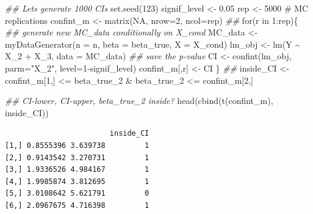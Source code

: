 \documentclass[
  letterpaper,
  DIV=11,
  numbers=noendperiod]{scrreprt}
\newenvironment{Shaded}{\begin{snugshade}}{\end{snugshade}}
\newcommand{\AttributeTok}[1]{\textcolor[rgb]{0.40,0.45,0.13}{#1}}
\newcommand{\CommentTok}[1]{\textcolor[rgb]{0.37,0.37,0.37}{#1}}
\newcommand{\ConstantTok}[1]{\textcolor[rgb]{0.56,0.35,0.01}{#1}}
\newcommand{\ControlFlowTok}[1]{\textcolor[rgb]{0.00,0.23,0.31}{#1}}
\newcommand{\DecValTok}[1]{\textcolor[rgb]{0.68,0.00,0.00}{#1}}
\newcommand{\DocumentationTok}[1]{\textcolor[rgb]{0.37,0.37,0.37}{\textit{#1}}}
\newcommand{\FloatTok}[1]{\textcolor[rgb]{0.68,0.00,0.00}{#1}}
\newcommand{\FunctionTok}[1]{\textcolor[rgb]{0.28,0.35,0.67}{#1}}
\newcommand{\NormalTok}[1]{\textcolor[rgb]{0.00,0.23,0.31}{#1}}
\newcommand{\OtherTok}[1]{\textcolor[rgb]{0.00,0.23,0.31}{#1}}
\newcommand{\SpecialCharTok}[1]{\textcolor[rgb]{0.37,0.37,0.37}{#1}}
\newcommand{\StringTok}[1]{\textcolor[rgb]{0.13,0.47,0.30}{#1}}
\theoremstyle{definition}
\theoremstyle{plain}
\theoremstyle{plain}
\theoremstyle{remark}
\begin{document}
\begin{Shaded}
\begin{Highlighting}[]
\DocumentationTok{\#\# Let\textquotesingle{}s generate 1000 CIs }
\FunctionTok{set.seed}\NormalTok{(}\DecValTok{123}\NormalTok{)}
\NormalTok{signif\_level }\OtherTok{\textless{}{-}}  \FloatTok{0.05}
\NormalTok{rep          }\OtherTok{\textless{}{-}} \DecValTok{5000} \CommentTok{\# MC replications}
\NormalTok{confint\_m    }\OtherTok{\textless{}{-}} \FunctionTok{matrix}\NormalTok{(}\ConstantTok{NA}\NormalTok{, }\AttributeTok{nrow=}\DecValTok{2}\NormalTok{, }\AttributeTok{ncol=}\NormalTok{rep)}
\DocumentationTok{\#\#}
\ControlFlowTok{for}\NormalTok{(r }\ControlFlowTok{in} \DecValTok{1}\SpecialCharTok{:}\NormalTok{rep)\{}
  \DocumentationTok{\#\# generate new MC\_data conditionally on X\_cond}
\NormalTok{    MC\_data }\OtherTok{\textless{}{-}} \FunctionTok{myDataGenerator}\NormalTok{(}\AttributeTok{n    =}\NormalTok{ n, }
                               \AttributeTok{beta =}\NormalTok{ beta\_true, }
                               \AttributeTok{X    =}\NormalTok{ X\_cond)}
\NormalTok{    lm\_obj            }\OtherTok{\textless{}{-}} \FunctionTok{lm}\NormalTok{(Y }\SpecialCharTok{\textasciitilde{}}\NormalTok{ X\_2 }\SpecialCharTok{+}\NormalTok{ X\_3, }\AttributeTok{data =}\NormalTok{ MC\_data)}
    \DocumentationTok{\#\# save the p{-}value}
\NormalTok{    CI }\OtherTok{\textless{}{-}} \FunctionTok{confint}\NormalTok{(lm\_obj, }\AttributeTok{parm=}\StringTok{"X\_2"}\NormalTok{, }\AttributeTok{level=}\DecValTok{1}\SpecialCharTok{{-}}\NormalTok{signif\_level)}
\NormalTok{    confint\_m[,r] }\OtherTok{\textless{}{-}}\NormalTok{ CI}
\NormalTok{\}}
\DocumentationTok{\#\#}
\NormalTok{inside\_CI  }\OtherTok{\textless{}{-}}\NormalTok{ confint\_m[}\DecValTok{1}\NormalTok{,] }\SpecialCharTok{\textless{}=}\NormalTok{ beta\_true\_2 }\SpecialCharTok{\&} 
\NormalTok{                beta\_true\_2 }\SpecialCharTok{\textless{}=}\NormalTok{ confint\_m[}\DecValTok{2}\NormalTok{,]}

\DocumentationTok{\#\# CI{-}lower, CI{-}upper, beta\_true\_2 inside?}
\FunctionTok{head}\NormalTok{(}\FunctionTok{cbind}\NormalTok{(}\FunctionTok{t}\NormalTok{(confint\_m), inside\_CI))}
\end{Highlighting}
\end{Shaded}

\begin{verbatim}
                        inside_CI
[1,] 0.8555396 3.639738         1
[2,] 0.9143542 3.270731         1
[3,] 1.9336526 4.984167         1
[4,] 1.9985874 3.812695         1
[5,] 3.0108642 5.621791         0
[6,] 2.0967675 4.716398         1
\end{verbatim}
\end{document}
